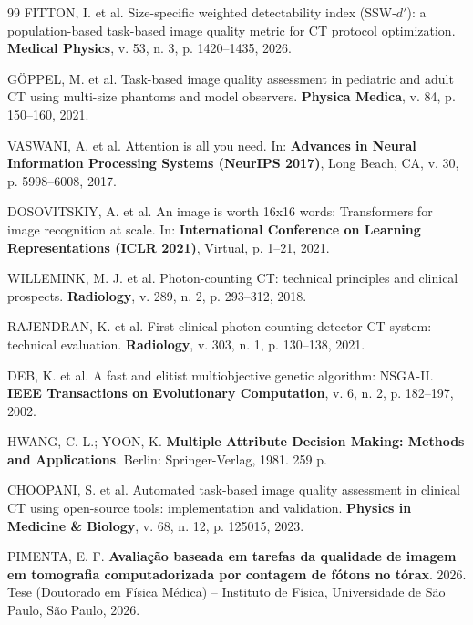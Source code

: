 \documentclass[
  12pt,
  a4paper,
  oneside
]{report}
\begin{document}
\begin{thebibliography}{99}
FITTON, I. et al. Size-specific weighted detectability index (SSW-$d'$): a population-based task-based image quality metric for CT protocol optimization. \textbf{Medical Physics}, v. 53, n. 3, p. 1420--1435, 2026.

GÖPPEL, M. et al. Task-based image quality assessment in pediatric and adult CT using multi-size phantoms and model observers. \textbf{Physica Medica}, v. 84, p. 150--160, 2021.

VASWANI, A. et al. Attention is all you need. In: \textbf{Advances in Neural Information Processing Systems (NeurIPS 2017)}, Long Beach, CA, v. 30, p. 5998--6008, 2017.

DOSOVITSKIY, A. et al. An image is worth 16x16 words: Transformers for image recognition at scale. In: \textbf{International Conference on Learning Representations (ICLR 2021)}, Virtual, p. 1--21, 2021.

WILLEMINK, M. J. et al. Photon-counting CT: technical principles and clinical prospects. \textbf{Radiology}, v. 289, n. 2, p. 293--312, 2018.

RAJENDRAN, K. et al. First clinical photon-counting detector CT system: technical evaluation. \textbf{Radiology}, v. 303, n. 1, p. 130--138, 2021.

DEB, K. et al. A fast and elitist multiobjective genetic algorithm: NSGA-II. \textbf{IEEE Transactions on Evolutionary Computation}, v. 6, n. 2, p. 182--197, 2002.

HWANG, C. L.; YOON, K. \textbf{Multiple Attribute Decision Making: Methods and Applications}. Berlin: Springer-Verlag, 1981. 259 p.

CHOOPANI, S. et al. Automated task-based image quality assessment in clinical CT using open-source tools: implementation and validation. \textbf{Physics in Medicine \& Biology}, v. 68, n. 12, p. 125015, 2023.

PIMENTA, E. F. \textbf{Avaliação baseada em tarefas da qualidade de imagem em tomografia computadorizada por contagem de fótons no tórax}. 2026. Tese (Doutorado em Física Médica) – Instituto de Física, Universidade de São Paulo, São Paulo, 2026.

\end{thebibliography}
\end{document}
